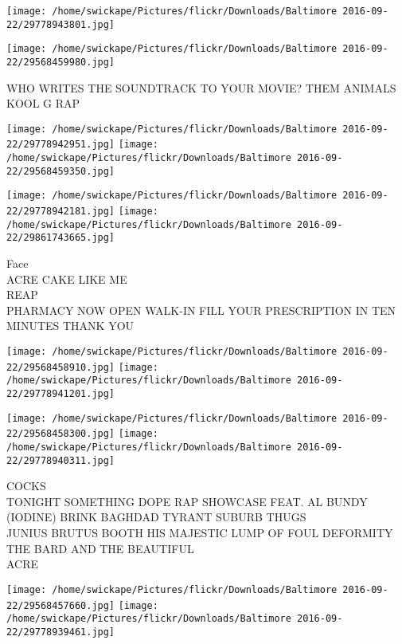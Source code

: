 \documentclass[10pt,letterpaper]{article}
\begin{document}
\texttt{[image: /home/swickape/Pictures/flickr/Downloads/Baltimore 2016-09-22/29778943801.jpg]}

\vspace{0.25in}
\texttt{[image: /home/swickape/Pictures/flickr/Downloads/Baltimore 2016-09-22/29568459980.jpg]}

WHO WRITES THE SOUNDTRACK TO YOUR MOVIE?  THEM ANIMALS\\
KOOL G RAP\\
\pagebreak

\texttt{[image: /home/swickape/Pictures/flickr/Downloads/Baltimore 2016-09-22/29778942951.jpg]}
\texttt{[image: /home/swickape/Pictures/flickr/Downloads/Baltimore 2016-09-22/29568459350.jpg]}

\texttt{[image: /home/swickape/Pictures/flickr/Downloads/Baltimore 2016-09-22/29778942181.jpg]}
\texttt{[image: /home/swickape/Pictures/flickr/Downloads/Baltimore 2016-09-22/29861743665.jpg]}

Face\\
ACRE CAKE LIKE ME\\
REAP\\
PHARMACY NOW OPEN WALK{-}IN FILL YOUR PRESCRIPTION IN TEN MINUTES THANK YOU\\
\pagebreak

\texttt{[image: /home/swickape/Pictures/flickr/Downloads/Baltimore 2016-09-22/29568458910.jpg]}
\texttt{[image: /home/swickape/Pictures/flickr/Downloads/Baltimore 2016-09-22/29778941201.jpg]}

\texttt{[image: /home/swickape/Pictures/flickr/Downloads/Baltimore 2016-09-22/29568458300.jpg]}
\texttt{[image: /home/swickape/Pictures/flickr/Downloads/Baltimore 2016-09-22/29778940311.jpg]}

COCKS\\
TONIGHT SOMETHING DOPE RAP SHOWCASE FEAT. AL BUNDY (IODINE) BRINK BAGHDAD TYRANT SUBURB THUGS\\
JUNIUS BRUTUS BOOTH HIS MAJESTIC LUMP OF FOUL DEFORMITY THE BARD AND THE BEAUTIFUL\\
ACRE\\
\pagebreak

\texttt{[image: /home/swickape/Pictures/flickr/Downloads/Baltimore 2016-09-22/29568457660.jpg]}
\texttt{[image: /home/swickape/Pictures/flickr/Downloads/Baltimore 2016-09-22/29778939461.jpg]}
\end{document}
